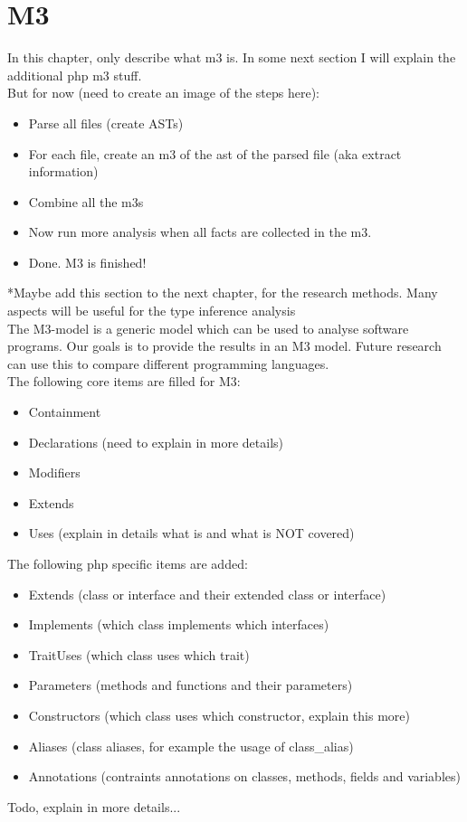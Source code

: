\documentclass[../main.tex]{subfiles}
\begin{document}
    \section{M3}
    In this chapter, only describe what m3 is.
    In some next section I will explain the additional php m3 stuff.
    \\
    But for now (need to create an image of the steps here):
    \begin{itemize}
        \item Parse all files (create \gls{AST}s)
        \item For each file, create an m3 of the ast of the parsed file (aka extract information)
        \item Combine all the m3s
        \item Now run more analysis when all facts are collected in the m3.
        \item Done. M3 is finished! 
    \end{itemize}

    \footnotesize{*Maybe add this section to the next chapter, for the research methods. Many aspects will be useful for the type inference analysis}
    \\
    The M3-model is a generic model which can be used to analyse software programs.
    Our goals is to provide the results in an M3 model.
    Future research can use this to compare different programming languages.
    \\ 
    The following core items are filled for M3:
    \begin{itemize}
        \item Containment
        \item Declarations (need to explain in more details)
        \item Modifiers
        \item Extends
        \item Uses (explain in details what is and what is NOT covered)
    \end{itemize}
    
    The following php specific items are added:
    \begin{itemize}
        \item Extends (class or interface and their extended class or interface)
        \item Implements (which class implements which interfaces)
        \item TraitUses (which class uses which trait)
        \item Parameters (methods and functions and their parameters)
        \item Constructors (which class uses which constructor, explain this more)
        \item Aliases (class aliases, for example the usage of class\_{}alias)
        \item Annotations (contraints annotations on classes, methods, fields and variables)
    \end{itemize}
    Todo, explain in more details...
\end{document}
